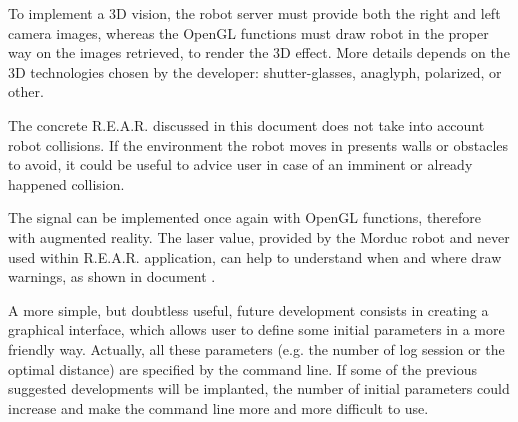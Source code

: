 %
To implement a 3D vision, the robot server must provide both the right and left camera images,
whereas the OpenGL functions must draw robot in the proper way on the images retrieved, to render
the 3D effect. More details depends on the 3D technologies chosen by the developer: shutter-glasses,
anaglyph, polarized, or other.
%

%
The concrete \textsf{R.E.A.R.} discussed in this document does not take into account robot
collisions. If the environment the robot moves in presents walls or obstacles to avoid, it could
be useful to advice user in case of an imminent or already happened collision.
%

%
The signal can be implemented once again with OpenGL functions, therefore with augmented reality.
The laser value, provided by the Morduc robot and never used within \textsf{R.E.A.R.} application,
can help to understand when and where draw warnings, as shown in document \cite{morduc:macalusodetommaso}.
%

%
A more simple, but doubtless useful, future development consists in creating a graphical interface,
which allows user to define some initial parameters in a more friendly way. Actually, all these
parameters (e.g. the number of log session or the optimal distance) are specified by the command line.
If some of the previous suggested developments will be implanted, the number of initial parameters
could increase and make the command line more and more difficult to use.
